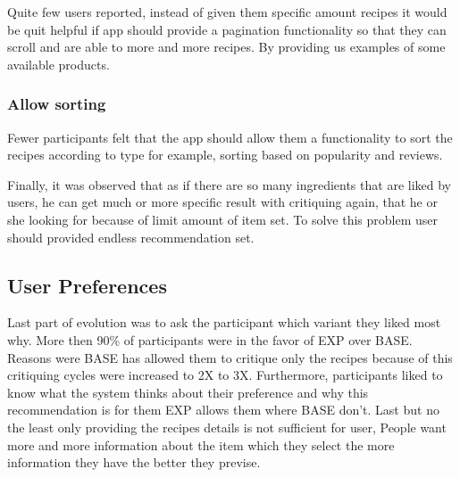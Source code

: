 Quite few users reported, instead of given them specific amount recipes it would be quit helpful if app should provide a pagination functionality so that they can scroll and are able to more and more recipes. By providing us examples of some available products.
	
\subsubsection{Allow sorting}
Fewer participants felt that the app should allow them a functionality to sort the recipes according to type for example, sorting based on popularity and reviews.\newline

Finally, it was observed that as if there are so many ingredients that are liked by users, he can get much or more specific result with critiquing again, that he or she looking for because of limit amount of item set. To solve this problem user should provided endless recommendation set.

\subsection{User Preferences}

Last part of evolution was to ask the participant which variant they liked most why. More then 90\% of participants were in the favor of EXP over BASE. Reasons were BASE has allowed them to critique only the recipes because of this critiquing cycles were increased to 2X to 3X. Furthermore, participants liked to know what the system thinks about their preference and why this recommendation is for them EXP allows them where BASE don’t. Last but no the least only providing the recipes details is not sufficient for user, People want more and more information about the item which they select the more information they have the better they previse. 

